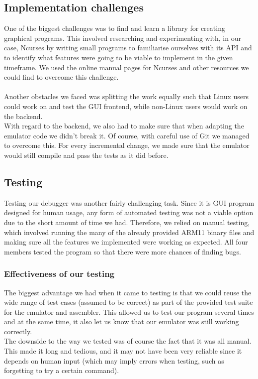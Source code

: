\documentclass[11pt]{article}
\begin{document}
\subsection{Implementation challenges}
One of the biggest challenges was to find and learn a library for creating graphical programs. This involved researching and experimenting with, in our case, Ncurses by writing small programs to familiarise ourselves with its API and to identify what features were going to be viable to implement in the given timeframe. We used the online manual pages for Ncurses and other resources we could find to overcome this challenge.\\\\
Another obstacles we faced was splitting the work equally such that Linux users could work on and test the GUI frontend, while non-Linux users would work on the backend.\\
With regard to the backend, we also had to make sure that when adapting the emulator code we didn't break it. Of course, with careful use of Git we managed to overcome this. For every incremental change, we made sure that the emulator would still compile and pass the tests as it did before.

\newpage
\subsection{Testing}
Testing our debugger was another fairly challenging task. Since it is GUI program designed for human usage, any form of automated testing was not a viable option due to the short amount of time we had. Therefore, we relied on manual testing, which involved running the many of the already provided ARM11 binary files and making sure all the features we implemented were working as expected. All four members tested the program so that there were more chances of finding bugs.

\subsubsection{Effectiveness of our testing}
The biggest advantage we had when it came to testing is that we could reuse the wide range of test cases (assumed to be correct) as part of the provided test suite for the emulator and assembler. This allowed us to test our program several times and at the same time, it also let us know that our emulator was still working correctly.\\
The downside to the way we tested was of course the fact that it was all manual. This made it long and tedious, and it may not have been very reliable since it depends on human input (which may imply errors when testing, such as forgetting to try a certain command).
\end{document}
